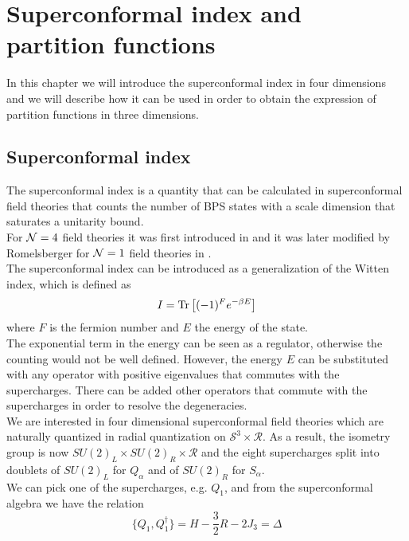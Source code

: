 

\chapter{Superconformal index and partition functions}

In this chapter we will introduce the superconformal index in four dimensions and we will describe how it can be used in order to obtain the expression of partition functions in three dimensions.\\
{\color{red}{ \LARGE Devo Aggiunger qualcosa}}


\section{Superconformal index}
The superconformal index is a quantity that can be calculated in superconformal field theories that counts the number of BPS states with a scale dimension that saturates a unitarity bound.\\
For $\mathcal{N}=4$ field theories it was first introduced in \cite{Kinney:2005ej}
and it was later modified by Romelsberger for $\mathcal{N}=1$ field theories in \cite{Romelsberger:2005eg}.\\
The superconformal index can be introduced as a generalization of the Witten index, which is defined as 
\begin{equation}
I = \mathrm{Tr } \,{ \left[   (-1)^F e^{-\beta E}\right]}
\end{equation}
where $F$ is the fermion number and $E$ the energy of the state.\\
The exponential term in the energy can be seen as a regulator, otherwise the counting would not be well defined.
However, the energy $E$ can be substituted with any operator with positive eigenvalues that commutes with the supercharges. 
There can be added other operators that commute with the supercharges in order to resolve the degeneracies.
\\
We are interested in four dimensional superconformal field theories which are naturally quantized in radial quantization on $\mathcal{S}^3 \times \mathcal{R}$. 
As a result, the isometry group is now $SU(2)_L \times SU(2)_R \times \mathcal{R}$ and the eight supercharges split into doublets of $SU(2)_L$ for $Q_{\alpha}$ and of $SU(2)_R$ for $S_{\alpha}$.\\
We can pick one of the supercharges, e.g. $Q_1$, and from the superconformal algebra we have the relation
\begin{equation}
 \{Q_1, Q_1^{\dagger} \} = H - \frac{3}{2} R - 2 J_3 = \Delta
 \end{equation} 
